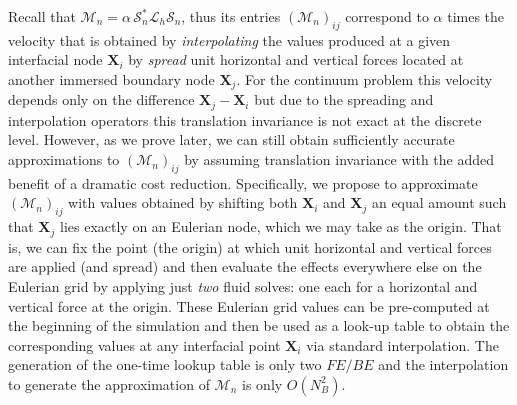 \documentclass[preprint,12pt]{elsarticle}
\begin{document}
Recall that $\mathcal{M}_n =  \alpha \,  \mathcal{S}^*_n \mathcal{L}_h \mathcal{S}_n$, thus its entries  $(\mathcal{M}_n)_{ij}$ 
correspond to $\alpha$ times  the velocity that is obtained by {\em interpolating}  
the values produced at a given interfacial node $\mathbf{X}_i$ by  {\em spread} unit horizontal and vertical forces located at another immersed boundary node  $\mathbf{X}_j$. For the continuum  problem this velocity depends only on the difference 
$\mathbf{X}_j - \mathbf{X}_i$ but due to the spreading and interpolation operators this translation invariance is not exact at the discrete level. However, as we prove later, we can still obtain sufficiently accurate approximations to  $(\mathcal{M}_n)_{ij}$  by assuming translation invariance with the added benefit of a dramatic cost reduction.
Specifically, we propose to approximate $(\mathcal{M}_n)_{ij}$  with values obtained  by shifting both $\mathbf{X}_i$ and $\mathbf{X}_j$ an equal amount such that $\mathbf{X}_j$ lies exactly on an Eulerian node, which we may take as the origin. That is, we can fix the point (the origin) at which unit horizontal and vertical forces are applied (and spread) and then evaluate the effects everywhere else on the Eulerian grid by  applying just {\em two} fluid solves: one each for a horizontal and vertical force at the origin. These Eulerian grid values can be pre-computed at the
beginning of the simulation and then be used as a look-up table to obtain the corresponding values at 
any interfacial point $\mathbf{X}_i$  via standard interpolation. The generation of the one-time lookup table is only two $FE/BE$ and
the interpolation to generate the approximation of  $\mathcal{M}_n$ is only $O(N_B^2)$.
\end{document}
